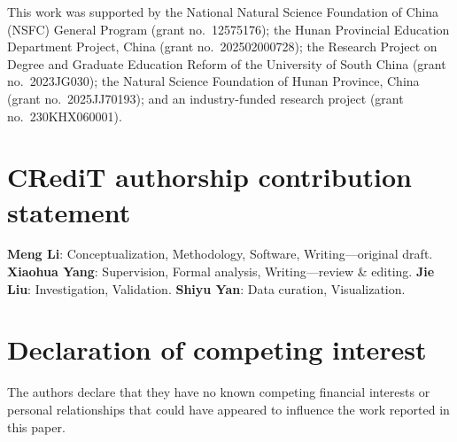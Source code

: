 \documentclass[review,12pt,authoryear]{elsarticle}
\begin{document}
This work was supported by the National Natural Science Foundation of China (NSFC) General Program (grant no.\ 12575176); the Hunan Provincial Education Department Project, China (grant no.\ 202502000728); the Research Project on Degree and Graduate Education Reform of the University of South China (grant no.\ 2023JG030); the Natural Science Foundation of Hunan Province, China (grant no.\ 2025JJ70193); and an industry-funded research project (grant no.\ 230KHX060001).

\section*{CRediT authorship contribution statement}

\textbf{Meng Li}: Conceptualization, Methodology, Software, Writing---original draft. \textbf{Xiaohua Yang}: Supervision, Formal analysis, Writing---review \& editing. \textbf{Jie Liu}: Investigation, Validation. \textbf{Shiyu Yan}: Data curation, Visualization.

\section*{Declaration of competing interest}

The authors declare that they have no known competing financial interests or personal relationships that could have appeared to influence the work reported in this paper.
\end{document}

